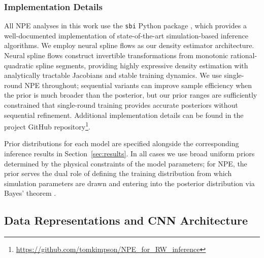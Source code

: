 \documentclass{article}
\begin{document}
\subsubsection{Implementation Details}

All NPE analyses in this work use the \texttt{sbi} Python package \cite{Boelts2025sbi}, which provides a well-documented implementation of state-of-the-art simulation-based inference algorithms. We employ neural spline flows \cite{durkan2019neural} as our density estimator architecture. Neural spline flows construct invertible transformations from monotonic rational-quadratic spline segments, providing highly expressive density estimation with analytically tractable Jacobians and stable training dynamics. We use single-round NPE throughout; sequential variants \citep{papamakarios2016fast, greenberg2019automatic} can improve sample efficiency when the prior is much broader than the posterior, but our prior ranges are sufficiently constrained that single-round training provides accurate posteriors without sequential refinement. Additional implementation details can be found in the project GitHub repository\footnote{\href{github.com/tomkimpson/NPE_for_RW_inference}{https://github.com/tomkimpson/NPE\_for\_RW\_inference}}.

Prior distributions for each model are specified alongside the corresponding inference results in Section~\ref{sec:results}. In all cases we use broad uniform priors determined by the physical constraints of the model parameters; for NPE, the prior serves the dual role of defining the training distribution from which simulation parameters are drawn and entering into the posterior distribution via Bayes' theorem \citep{Gelman1995,Gelman2017}.



\subsection{Data Representations and CNN Architecture}\label{sec:data_architecture}
\end{document}
